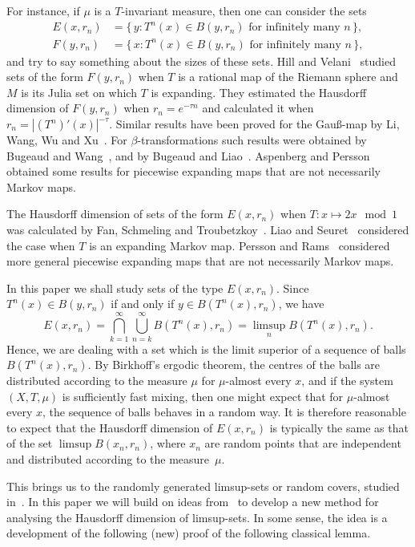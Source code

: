 \documentclass[11pt]{article}
\theoremstyle{definition}
\numberwithin{equation}{section}
\numberwithin{figure}{section}
\numberwithin{table}{section}
\begin{document}
For instance, if $\mu$ is a $T$-invariant measure, then one can consider the sets
\begin{align*}
E (x,r_n) &= \{\, y : T^n (x) \in B(y,r_n) \text{ for infinitely many } n \,\},\\ F (y,r_n) &= \{\, x : T^n (x) \in B(y,r_n) \text{ for infinitely many } n \,\},
\end{align*}
and try to say something about the sizes of these sets. Hill and Velani~\cite{hillvelani} studied sets of the form $F(y, r_n)$ when $T$ is a rational map of the Riemann sphere and $M$ is its Julia set on which $T$ is expanding. They estimated the Hausdorff dimension of $F(y,r_n)$ when $r_n = e^{-\tau n}$ and calculated it when $r_n = |(T^n)' (x)|^{-\tau}$. Similar results have been proved for the Gau\ss-map by Li, Wang, Wu and Xu~\cite{liwangwuxu}. For $\beta$-transformations such results were obtained by Bugeaud and Wang~\cite{bugeaudwang}, and by Bugeaud and Liao~\cite{bugeaudliao}. Aspenberg and Persson~\cite{aspenbergpersson} obtained some results for piecewise expanding maps that are not necessarily Markov maps.

The Hausdorff dimension of sets of the form $E(x,r_n)$ when $T \colon x \mapsto 2x \mod 1$ was calculated by Fan, Schmeling and Troubetzkoy~\cite{fanschmelingtroubetzkoy}. Liao and Seuret~\cite{liaoseuret} considered the case when $T$ is an expanding Markov map. Persson and Rams~\cite{perssonrams} considered more general piecewise expanding maps that are not necessarily Markov maps.

In this paper we shall study sets of the type $E (x,r_n)$. Since $T^n (x) \in B(y,r_n)$ if and only if $y \in B(T^n(x),r_n)$, we have
\[
E(x,r_n) = \bigcap_{k=1}^\infty \bigcup_{n=k}^\infty B(T^n(x),r_n) =
\limsup_n B(T^n(x),r_n).
\]
Hence, we are dealing with a set which is the limit superior of a sequence of balls $B(T^n(x),r_n)$. By Birkhoff's ergodic theorem, the centres of the balls are distributed according to the measure $\mu$ for $\mu$-almost every $x$, and if the system $(X,T,\mu)$ is sufficiently fast mixing, then one might expect that for $\mu$-almost every $x$, the sequence of balls behaves in a random way. It is therefore reasonable to expect that the Hausdorff dimension of $E(x,r_n)$ is typically the same as that of the set $\limsup B(x_n,r_n)$, where $x_n$ are random points that are independent and distributed according to the measure~$\mu$.

This brings us to the randomly generated limsup-sets or random covers, studied in~\cite{fanwu,durand,jarvenpaaetal,persson,fengetal,seuret,ekstrompersson}. In this paper we will build on ideas from~\cite{persson} to develop a new method for analysing the Hausdorff dimension of limsup-sets. In some sense, the idea is a development of the following (new) proof of the following classical lemma.
\end{document}

